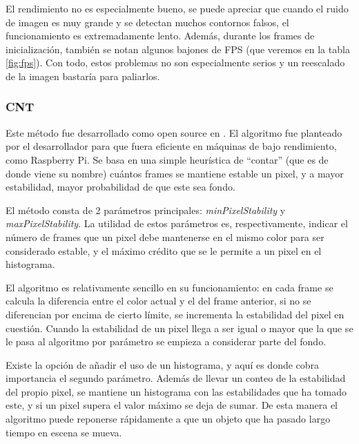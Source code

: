El rendimiento no es especialmente bueno, se puede apreciar que cuando el ruido de imagen es muy grande y se detectan muchos contornos falsos, el funcionamiento es extremadamente lento. Además, durante los frames de inicialización, también se notan algunos bajones de FPS (que veremos en la tabla \ref{fig:fps}). Con todo, estos problemas no son especialmente serios y un reescalado de la imagen bastaría para paliarlos.


\subsubsection*{CNT}
Este método fue desarrollado como open source en \cite{git:CNT}. El algoritmo fue planteado por el desarrollador para que fuera eficiente en máquinas de bajo rendimiento, como Raspberry Pi. Se basa en una simple heurística de ``contar'' (que es de donde viene su nombre) cuántos frames se mantiene estable un pixel, y a mayor estabilidad, mayor probabilidad de que este sea fondo.

El método consta de 2 parámetros principales: \textit{minPixelStability} y \textit{maxPixelStability}. La utilidad de estos parámetros es, respectivamente, indicar el número de frames que un pixel debe mantenerse en el mismo color para ser considerado estable, y el máximo crédito que se le permite a un pixel en el histograma.

El algoritmo es relativamente sencillo en su funcionamiento: en cada frame se calcula la diferencia entre el color actual y el del frame anterior, si no se diferencian por encima de cierto límite, se incrementa la estabilidad del pixel en cuestión. Cuando la estabilidad de un pixel llega a ser igual o mayor que la que se le pasa al algoritmo por parámetro se empieza a considerar parte del fondo.

Existe la opción de añadir el uso de un histograma, y aquí es donde cobra importancia el segundo parámetro. Además de llevar un conteo de la estabilidad del propio pixel, se mantiene un histograma con las estabilidades que ha tomado este, y si un pixel supera el valor máximo se deja de sumar. De esta manera el algoritmo puede reponerse rápidamente a que un objeto que ha pasado largo tiempo en escena se mueva.


